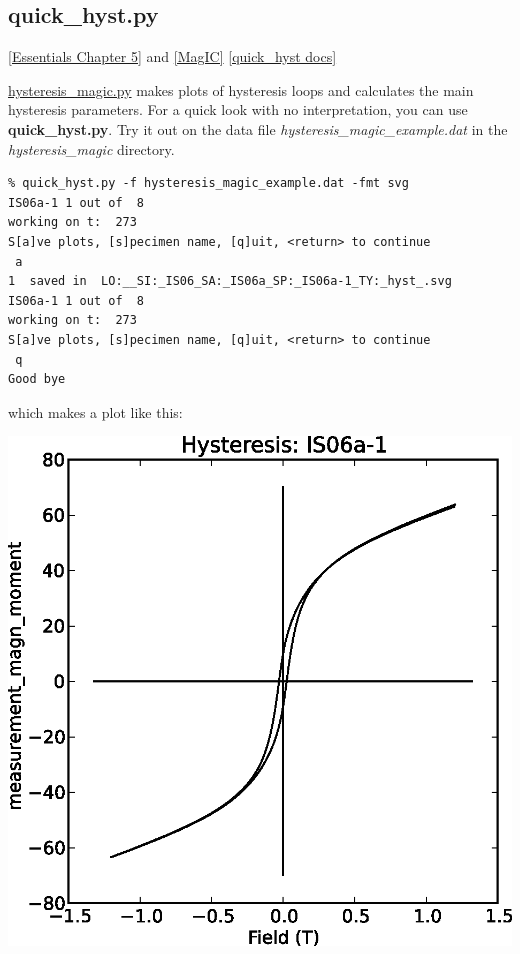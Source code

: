 \documentclass[11pt]{book}
\begin{document}
{{{%
\subsection{quick\_hyst.py}
\href{http://magician.ucsd.edu/Essentials_2/WebBook2ch5.html#ch5}{[Essentials Chapter 5]} and \href{#MagIC}{[MagIC]}
\href{http://earthref.org/PmagPy/pmagpydocs/quick_hyst-module.html}{[quick\_hyst docs]}

\href{#hysteresis_magic.py}{hysteresis\_magic.py} makes plots of hysteresis loops and calculates the main hysteresis parameters.  For a quick look with no interpretation, you can use {\bf quick\_hyst.py}.   Try it out on the data file {\it hysteresis\_magic\_example.dat} in the {\it hysteresis\_magic} directory.   

\begin{verbatim}
% quick_hyst.py -f hysteresis_magic_example.dat -fmt svg
IS06a-1 1 out of  8
working on t:  273
S[a]ve plots, [s]pecimen name, [q]uit, <return> to continue
 a
1  saved in  LO:__SI:_IS06_SA:_IS06a_SP:_IS06a-1_TY:_hyst_.svg
IS06a-1 1 out of  8
working on t:  273
S[a]ve plots, [s]pecimen name, [q]uit, <return> to continue
 q
Good bye
\end{verbatim}

which makes a plot like this:

\includegraphics[width=12 cm]{EPSfiles/quick_hyst.eps}

}}}
\end{document}
